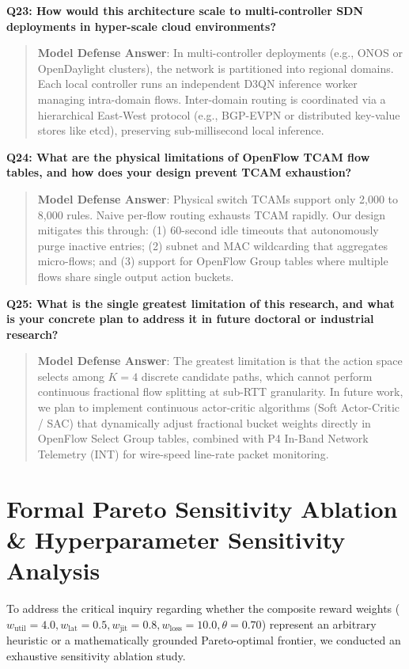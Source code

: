 \documentclass[12pt,a4paper,oneside]{report}
\begin{document}
\noindent\textbf{Q23: How would this architecture scale to multi-controller SDN deployments in hyper-scale cloud environments?}
\begin{quote}
\small
\textbf{Model Defense Answer}: In multi-controller deployments (e.g., ONOS or OpenDaylight clusters), the network is partitioned into regional domains. Each local controller runs an independent D3QN inference worker managing intra-domain flows. Inter-domain routing is coordinated via a hierarchical East-West protocol (e.g., BGP-EVPN or distributed key-value stores like etcd), preserving sub-millisecond local inference.
\end{quote}

\noindent\textbf{Q24: What are the physical limitations of OpenFlow TCAM flow tables, and how does your design prevent TCAM exhaustion?}
\begin{quote}
\small
\textbf{Model Defense Answer}: Physical switch TCAMs support only 2,000 to 8,000 rules. Naive per-flow routing exhausts TCAM rapidly. Our design mitigates this through: (1) 60-second idle timeouts that autonomously purge inactive entries; (2) subnet and MAC wildcarding that aggregates micro-flows; and (3) support for OpenFlow Group tables where multiple flows share single output action buckets.
\end{quote}

\noindent\textbf{Q25: What is the single greatest limitation of this research, and what is your concrete plan to address it in future doctoral or industrial research?}
\begin{quote}
\small
\textbf{Model Defense Answer}: The greatest limitation is that the action space selects among $K=4$ discrete candidate paths, which cannot perform continuous fractional flow splitting at sub-RTT granularity. In future work, we plan to implement continuous actor-critic algorithms (Soft Actor-Critic / SAC) that dynamically adjust fractional bucket weights directly in OpenFlow Select Group tables, combined with P4 In-Band Network Telemetry (INT) for wire-speed line-rate packet monitoring.
\end{quote}

\section{Formal Pareto Sensitivity Ablation \& Hyperparameter Sensitivity Analysis}
\label{sec:pareto_sensitivity_ablation}
To address the critical inquiry regarding whether the composite reward weights ($w_{\text{util}} = 4.0, w_{\text{lat}} = 0.5, w_{\text{jit}} = 0.8, w_{\text{loss}} = 10.0, \theta = 0.70$) represent an arbitrary heuristic or a mathematically grounded Pareto-optimal frontier, we conducted an exhaustive sensitivity ablation study.
\end{document}

